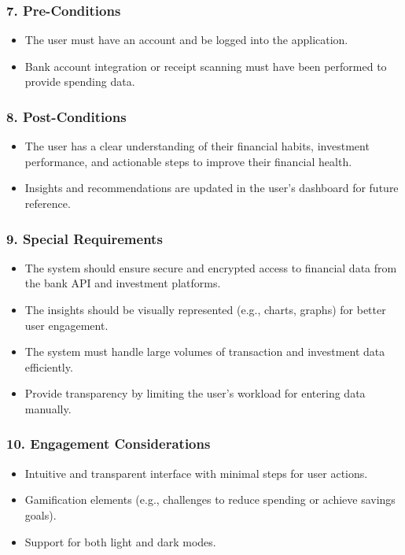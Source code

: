 \subsubsection*{7. Pre-Conditions}
\begin{itemize}
    \item The user must have an account and be logged into the application.
    \item Bank account integration or receipt scanning must have been performed to provide spending data.
\end{itemize}

\subsubsection*{8. Post-Conditions}
\begin{itemize}
    \item The user has a clear understanding of their financial habits, investment performance, and actionable steps to improve their financial health.
    \item Insights and recommendations are updated in the user's dashboard for future reference.
\end{itemize}

\subsubsection*{9. Special Requirements}
\begin{itemize}
    \item The system should ensure secure and encrypted access to financial data from the bank API and investment platforms.
    \item The insights should be visually represented (e.g., charts, graphs) for better user engagement.
    \item The system must handle large volumes of transaction and investment data efficiently.
    \item Provide transparency by limiting the user’s workload for entering data manually.
\end{itemize}

\subsubsection*{10. Engagement Considerations}
\begin{itemize}
    \item Intuitive and transparent interface with minimal steps for user actions.
    \item Gamification elements (e.g., challenges to reduce spending or achieve savings goals).
    \item Support for both light and dark modes.
\end{itemize}

